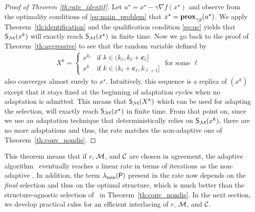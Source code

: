\begin{proof}[Proof of Theorem \ref{th:rate_identif}]
Let $u^\star = x^\star-\gamma \nabla f(x^\star)$ and observe from the optimality conditions of \eqref{eq:main_problem} that $x^\star =  \prox_{\gamma g}(u^\star)$. We apply Theorem~\ref{th:identification} and the qualification condition \eqref{eq:qc} yields that $\S(x^k)$ will exactly reach $\S(x^\star)$ in finite time. Now we go back to the proof of Theorem~\ref{th:aggressive} to see that the random variable defined by
\begin{align*}
    X^k = \left\{ \begin{array}{cl}
            x^{k_{\ell}} & \textrm{if } k\in(k_{\ell},k_{\ell}+\mathbf{c}_\ell]   \\
        x^k & \textrm{if } k\in(k_{\ell}+\mathbf{c}_\ell , k_{\ell+1}]  
    \end{array}\right. \textrm{ for some } \ell
\end{align*}
also converges almost surely to $x^\star$. Intuitively, this sequence is a replica of $(x^k)$ except that it stays fixed at the beginning of adaptation cycles when no adaptation is admitted. 
This means that $\S(X^k)$ which can be used for adapting the selection, will exactly reach $\S(x^\star)$ in finite time.
From that point on, since we use an adaptation technique that deterministically relies on $\S(x^k)$, there are no more adaptations and thus, the rate matches the non-adaptive one of Theorem~\ref{th:conv_nondis}.
\end{proof}

{
This theorem means that if $r$, $\M$, and $\C$ are chosen in agreement, the adaptive algorithm \adaalgo~eventually reaches a linear rate in terms of iterations as the non-adaptive \algo. In addition, the term $\lambda_{\min}(\bP)$ present in the rate now depends on the \emph{final} selection and thus on the optimal structure, which is much better than the structure-agnostic selection of \algo~in Theorem~\ref{th:conv_nondis}.  In the next section, we develop  practical rules for an efficient interlacing of $r$, $\M$, and $\C$. %
}


